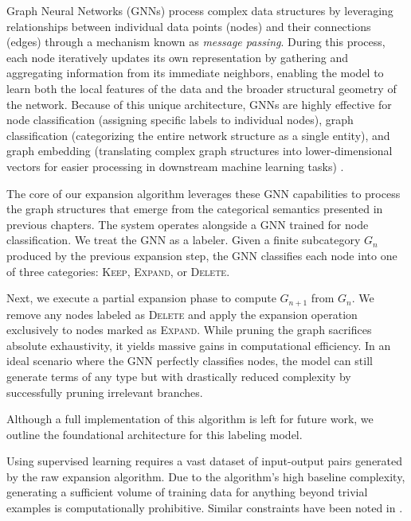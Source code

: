 Graph Neural Networks (GNNs) process complex data structures by leveraging relationships between individual 
data points (nodes) and their connections (edges) through a mechanism known as \textit{message passing}. 
During this process, each node iteratively updates its own representation by gathering and aggregating information 
from its immediate neighbors, enabling the model to learn both the local features of the data and the broader structural 
geometry of the network. Because of this unique architecture, GNNs are highly effective for node classification 
(assigning specific labels to individual nodes), graph classification (categorizing the entire network structure as a 
single entity), and graph embedding (translating complex graph structures into lower-dimensional vectors for easier 
processing in downstream machine learning tasks) \cite{wu2021, zhou2020}.

The core of our expansion algorithm leverages these GNN capabilities to process the graph structures that emerge from 
the categorical semantics presented in previous chapters. The system operates alongside a GNN trained for node classification. 
We treat the GNN as a labeler. Given a finite subcategory $G_n$ produced by the previous expansion step, 
the GNN classifies each node into one of three categories: \textsc{Keep}, \textsc{Expand}, or \textsc{Delete}.

Next, we execute a partial expansion phase to compute $G_{n+1}$ from $G_n$. We remove any nodes labeled as \textsc{Delete} and 
apply the expansion operation exclusively to nodes marked as \textsc{Expand}. While pruning the graph sacrifices absolute exhaustivity, 
it yields massive gains in computational efficiency. In an ideal scenario where the GNN perfectly classifies nodes, the model can still 
generate terms of any type but with drastically reduced complexity by successfully pruning irrelevant branches.

Although a full implementation of this algorithm is left for future work, we outline the foundational architecture for this labeling model. 

Using supervised learning requires a vast dataset of input-output pairs generated by the raw expansion algorithm. Due to the algorithm's 
high baseline complexity, generating a sufficient volume of training data for anything beyond trivial examples is computationally 
prohibitive. Similar constraints have been noted in \cite{wang2020}.

